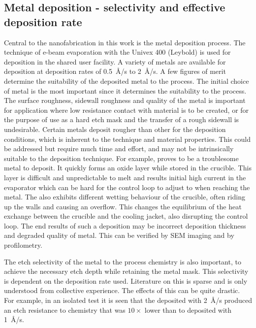 \subsection[Metal deposition]{Metal deposition - selectivity and effective deposition rate}\label{app:metal_deposition}

Central to the nanofabrication in this work is the metal deposition process. The technique of e-beam evaporation with the Univex 400 (Leybold) is used for deposition in the shared user facility. A variety of metals are available for deposition at deposition rates of \qty{0.5}{\angstrom/\second} to \qty{2}{\angstrom/\second}. A few figures of merit determine the suitability of the deposited metal to the process. The initial choice of metal is the most important since it determines the suitability to the process. The surface roughness, sidewall roughness and quality of the metal is important for application where low resistance contact with material is to be created, or for the purpose of use as a hard etch mask and the transfer of a rough sidewall is undesirable. Certain metals deposit rougher than other for the deposition conditions, which is inherent to the technique and material properties. This could be addressed but require much time and effort, and may not be intrinsically suitable to the deposition technique. For example,  proves to be a troublesome metal to deposit. It quickly forms an oxide layer while stored in the crucible. This layer is difficult and unpredictable to melt and results initial high current in the evaporator which can be hard for the control loop to adjust to when reaching the metal. The  also exhibits different wetting behaviour of the crucible, often riding up the walls and causing an overflow. This changes the equilibrium of the heat exchange between the crucible and the cooling jacket, also disrupting the control loop. The end results of such a deposition may be incorrect deposition thickness and degraded quality of metal. This can be verified by \gls{SEM} imaging and by profilometry.

The etch selectivity of the metal to the process chemistry is also important, to achieve the necessary etch depth while retaining the metal mask. This selectivity is dependent on the deposition rate used. Literature on this is sparse and is only understood from collective experience. The effects of this can be quite drastic. For example, in an isolated test it is seen that the  deposited with \qty{2}{\angstrom/\second} produced an etch resistance to  chemistry that was $10\times$ lower than to  deposited with \qty{1}{\angstrom/\second}.


